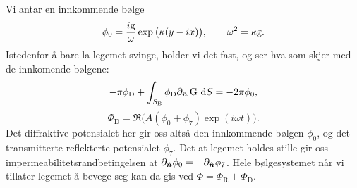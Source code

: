 Vi antar en innkommende bølge
\[
\phi_0 = \frac{i\mathrm{g}}{\omega} \exp{\big( \kappa(y - ix) \big)}, \qquad \omega^2 = \kappa\mathrm{g}.
\]
Istedenfor å bare la legemet svinge, holder vi det fast, og ser hva som skjer med de innkomende bølgene:
\[
-\pi\phi_{\mathrm{D}} + \int_{S_{\mathrm{B}}} \phi_{\mathrm{D}} \partial_{\bm{\hat{n}}}\operatorname{G} \,\mathrm{d} S = -2\pi\phi_0,
\]
\[
\Phi_{\mathrm{D}} = \Re{\big( A(\phi_0 + \phi_7)\exp{(i\omega t)} \big)}.
\]
Det diffraktive potensialet her gir oss altså den innkommende bølgen $\phi_0$, og det transmitterte-reflekterte potensialet $\phi_7$.
Det at legemet holdes stille gir oss impermeabilitetsrandbetingelsen at $\partial_{\bm{\hat{n}}}\phi_0 = -\partial_{\bm{\hat{n}}}\phi_7$.
Hele bølgesystemet når vi tillater legemet å bevege seg kan da gis ved $\Phi = \Phi_{\mathrm{R}} + \Phi_{\mathrm{D}}$.

